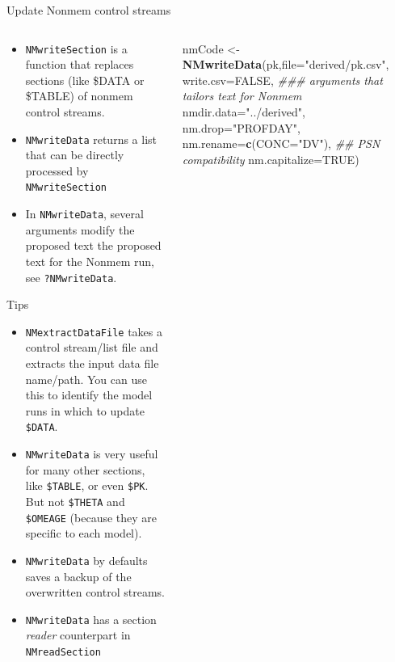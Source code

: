 \documentclass[
  8pt,
  ignorenonframetext,
  aspectratio=169]{beamer}
\newenvironment{Shaded}{\begin{snugshade}}{\end{snugshade}}
\newcommand{\CommentTok}[1]{\textcolor[rgb]{0.56,0.35,0.01}{\textit{#1}}}
\newcommand{\DataTypeTok}[1]{\textcolor[rgb]{0.13,0.29,0.53}{#1}}
\newcommand{\KeywordTok}[1]{\textcolor[rgb]{0.13,0.29,0.53}{\textbf{#1}}}
\newcommand{\NormalTok}[1]{#1}
\newcommand{\OtherTok}[1]{\textcolor[rgb]{0.56,0.35,0.01}{#1}}
\newcommand{\StringTok}[1]{\textcolor[rgb]{0.31,0.60,0.02}{#1}}
\begin{document}
\begin{frame}[fragile]{Update Nonmem control streams}
\protect\hypertarget{update-nonmem-control-streams}{}
\begin{columns}[T]
\begin{column}{0.48\textwidth}
\begin{itemize}
\item
  \texttt{NMwriteSection} is a function that replaces sections (like
  \$DATA or \$TABLE) of nonmem control streams.
\item
  \texttt{NMwriteData} returns a list that can be directly processed by
  \texttt{NMwriteSection}
\item
  In \texttt{NMwriteData}, several arguments modify the proposed text
  the proposed text for the Nonmem run, see \texttt{?NMwriteData}.
\end{itemize}

\begin{block}{Tips}
\protect\hypertarget{tips}{}
\begin{itemize}
\item
  \texttt{NMextractDataFile} takes a control stream/list file and
  extracts the input data file name/path. You can use this to identify
  the model runs in which to update \texttt{\$DATA}.
\item
  \texttt{NMwriteData} is very useful for many other sections, like
  \texttt{\$TABLE}, or even \texttt{\$PK}. But not \texttt{\$THETA} and
  \texttt{\$OMEAGE} (because they are specific to each model).
\item
  \texttt{NMwriteData} by defaults saves a backup of the overwritten
  control streams.
\item
  \texttt{NMwriteData} has a section \emph{reader} counterpart in
  \texttt{NMreadSection}
\end{itemize}
\end{block}
\end{column}

\begin{column}{0.48\textwidth}
\footnotesize

\begin{Shaded}
\begin{Highlighting}[]
\NormalTok{nmCode \textless{}{-}}\StringTok{ }\KeywordTok{NMwriteData}\NormalTok{(pk,}\DataTypeTok{file=}\StringTok{"derived/pk.csv"}\NormalTok{,}
                      \DataTypeTok{write.csv=}\OtherTok{FALSE}\NormalTok{,}
\CommentTok{\#\#\# arguments that tailors text for Nonmem}
                      \DataTypeTok{nmdir.data=}\StringTok{"../derived"}\NormalTok{,}
                      \DataTypeTok{nm.drop=}\StringTok{"PROFDAY"}\NormalTok{,}
                      \DataTypeTok{nm.rename=}\KeywordTok{c}\NormalTok{(}\DataTypeTok{CONC=}\StringTok{"DV"}\NormalTok{),}
                      \CommentTok{\#\# PSN compatibility}
                      \DataTypeTok{nm.capitalize=}\OtherTok{TRUE}\NormalTok{)}
\end{Highlighting}
\end{Shaded}


\end{column}
\end{columns}
\end{frame}
\end{document}
